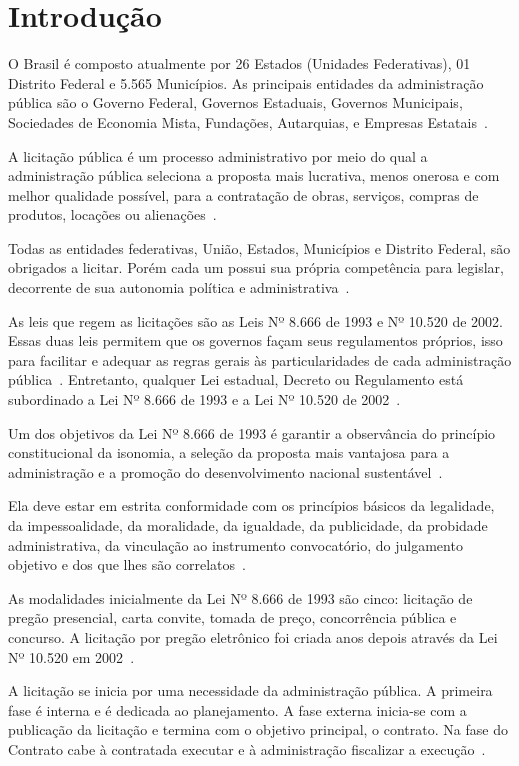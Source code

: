 \chapter*[Introdução]{Introdução}

O Brasil é composto atualmente por 26 Estados (Unidades Federativas), 01 Distrito Federal e 5.565 Municípios.
As principais entidades da administração pública são o Governo Federal, Governos Estaduais, Governos Municipais, Sociedades de Economia Mista, Fundações, Autarquias, e Empresas Estatais~\cite{thesing2012municipios}.

A licitação pública é um processo administrativo por meio do qual a administração pública seleciona a proposta mais lucrativa, menos onerosa e com melhor qualidade possível, para a contratação de obras, serviços, compras de produtos, locações ou alienações~\cite{l2300}.

Todas as entidades federativas, União, Estados, Municípios e Distrito Federal, são obrigados a licitar. 
Porém cada um possui sua própria competência para legislar, decorrente de sua autonomia política e administrativa~\cite{l8666}.

As leis que regem as licitações são as Leis Nº 8.666 de 1993 e Nº 10.520 de 2002. 
Essas duas leis permitem que os governos façam seus regulamentos próprios, isso para facilitar e adequar as regras gerais às particularidades de cada administração pública~\cite{123}.
Entretanto, qualquer Lei estadual, Decreto ou Regulamento está subordinado a Lei Nº 8.666 de 1993 e a Lei Nº 10.520 de 2002~\cite{123}. 

Um dos objetivos da Lei Nº 8.666 de 1993 é garantir a observância do princípio constitucional da isonomia, a seleção da proposta mais vantajosa para a administração e a promoção do desenvolvimento nacional sustentável~\cite{l8666}.

Ela deve estar em estrita conformidade com os princípios básicos da legalidade, da impessoalidade, da moralidade, da igualdade, da publicidade, da probidade administrativa, da vinculação ao instrumento convocatório, do julgamento objetivo e dos que lhes são correlatos~\cite{l8666}.

As modalidades inicialmente da Lei Nº 8.666 de 1993 são cinco: licitação de pregão presencial, carta convite, tomada de preço, concorrência pública e concurso. 
A licitação por pregão eletrônico foi criada anos depois através da Lei Nº 10.520 em 2002~\cite{l10529}.

A licitação se inicia por uma necessidade da administração pública. 
A primeira fase é interna e é dedicada ao planejamento. 
A fase externa inicia-se com a publicação da licitação e termina com o objetivo principal, o contrato. 
Na fase do Contrato cabe à contratada executar e à administração fiscalizar a execução~\cite{camarao2013fase}.


